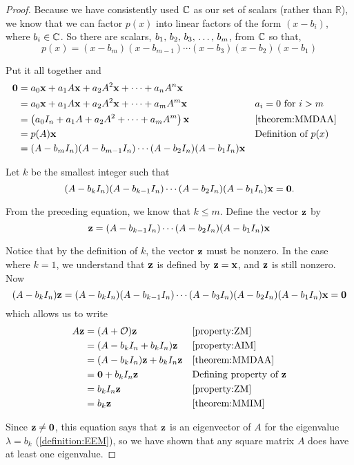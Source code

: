 \documentclass{ximera}
\begin{document}
\begin{theorem}
\begin{proof}
Because we have consistently used $\mathbb{C}$ as our set of scalars (rather than ${\mathbb R}$), we know that we can factor $p(x)$ into linear factors of the form $(x-b_i)$, where $b_i\in\mathbb{C}$.  So there are scalars, ${b}_{1},\,{b}_{2},\,{b}_{3},\,\ldots,\,{b}_{m}$, from $\mathbb{C}$ so that,
\[
p(x)=(x-b_m)(x-b_{m-1})\cdots(x-b_3)(x-b_2)(x-b_1)
\]




Put it all together and
\begin{align*}
\mathbf{0}&=a_0\mathbf{x}+a_1A\mathbf{x}+a_2A^2\mathbf{x}+\cdots+a_nA^n\mathbf{x}\\
&=a_0\mathbf{x}+a_1A\mathbf{x}+a_2A^2\mathbf{x}+\cdots+a_mA^m\mathbf{x}&&\text{$a_i=0$ for $i>m$}\\
&=\left(a_0I_n+a_1A+a_2A^2+\cdots+a_mA^m\right)\mathbf{x}&&\ref{theorem:MMDAA}\\
&=p(A)\mathbf{x}&&\text{Definition of $p(x)$}\\
&=(A-b_mI_n)(A-b_{m-1}I_n)\cdots(A-b_2I_n)(A-b_1I_n)\mathbf{x}
\end{align*}




Let $k$ be the smallest integer such that
\[
(A-b_kI_n)(A-b_{k-1}I_n)\cdots(A-b_2I_n)(A-b_1I_n)\mathbf{x}=\mathbf{0}.
\]




From the preceding equation, we know that $k\leq m$.  Define the vector $\mathbf{z}$ by
\[
\mathbf{z}=(A-b_{k-1}I_n)\cdots(A-b_2I_n)(A-b_1I_n)\mathbf{x}
\]




Notice that by the definition of $k$, the vector $\mathbf{z}$ must be nonzero.  In the case where $k=1$, we understand that $\mathbf{z}$ is defined by $\mathbf{z}=\mathbf{x}$, and $\mathbf{z}$ is still nonzero.  Now
\[
(A-b_kI_n)\mathbf{z}=(A-b_kI_n)(A-b_{k-1}I_n)\cdots(A-b_3I_n)(A-b_2I_n)(A-b_1I_n)\mathbf{x}=\mathbf{0}
\]
which allows us to write
\begin{align*}
A\mathbf{z}
&=(A+\mathcal{O})\mathbf{z}&&\ref{property:ZM}\\
&=(A-b_kI_n+b_kI_n)\mathbf{z}&&\ref{property:AIM}\\
&=(A-b_kI_n)\mathbf{z}+b_kI_n\mathbf{z}&&\ref{theorem:MMDAA}\\
&=\mathbf{0}+b_kI_n\mathbf{z}&&\text{Defining property of $\mathbf{z}$}\\
&=b_kI_n\mathbf{z}&&\ref{property:ZM}\\
&=b_k\mathbf{z}&&\ref{theorem:MMIM}
\end{align*}




Since $\mathbf{z}\neq\mathbf{0}$, this equation says that $\mathbf{z}$ is an eigenvector of $A$ for the eigenvalue $\lambda=b_k$ (\ref{definition:EEM}), so we have shown that any square matrix $A$ does have at least one eigenvalue.



\end{proof}
\end{theorem}
\end{document}
